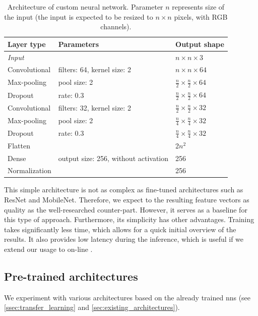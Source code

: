 \begin{table}
    \centering
    \begin{tabular}{l|l|l}
         Layer type & Parameters & Output shape \\ \hline
         \emph{Input} & & $n \times n \times 3$ \\
         Convolutional & filters: 64, kernel size: 2 & $n \times n \times 64$ \\
         Max-pooling & pool size: 2 & $\frac{n}{2} \times \frac{n}{2} \times 64$ \\
         Dropout & rate: 0.3 & $\frac{n}{2} \times \frac{n}{2} \times 64$ \\
         Convolutional & filters: 32, kernel size: 2 & $\frac{n}{2} \times \frac{n}{2} \times 32$ \\
         Max-pooling & pool size: 2 & $\frac{n}{4} \times \frac{n}{4} \times 32$ \\
         Dropout & rate: 0.3 & $\frac{n}{4} \times \frac{n}{4} \times 32$ \\
         Flatten & & 2$n^2$ \\
         Dense & output size: 256, without activation & 256 \\
         Normalization & & 256
    \end{tabular}
    \caption[Architecture of custom neural network]{Architecture of custom neural network. Parameter $n$ represents size of the input (the input is expected to be resized to $n\times n$ pixels, with RGB channels).}
    \label{tab:custom_architecture}
\end{table}

This simple architecture is not as complex as fine-tuned architectures such as ResNet and MobileNet. Therefore, we expect to the resulting feature vectors as quality as the well-researched counter-part. However, it serves as a baseline for this type of approach. Furthermore, its simplicity has other advantages. Training takes significantly less time, which allows for a quick initial overview of the results. It also provides low latency during the inference, which is useful if we extend our usage to on-line \reid{}.

\subsection{Pre-trained architectures}

We experiment with various architectures based on the already trained \glspl{nn} (see \autoref{ssec:transfer_learning} and \autoref{sec:existing_architectures}).

